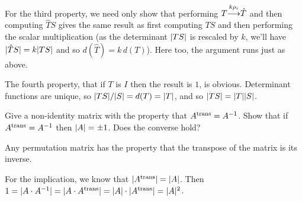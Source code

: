 \begin{exercises}
\begin{answer}
\begin{exparts}
          For the third property, we need only show that performing
          $T\smash[b]{\mathrel{ \mathop{\longrightarrow}\limits^{k\rho_i\mathstrut}_{ \begin{subarray}{l} \relax \end{subarray}}}}\hat{T}$ 
          and then computing \( \hat{T}S \) gives the same result as
          first computing \( TS \) and then performing the scalar 
          multiplication
          (as the determinant \( \deter{TS} \) is rescaled by \( k \), 
          we'll have \( \deter{\hat{T}S}=k\deter{TS} \) and
          so \( d(\hat{T})=k\,d(T) \)).
          Here too, the argument runs just as above.

          The fourth property, that if $T$ is $I$ then the result is $1$, 
          is obvious.
        \partsitem Determinant functions are unique, so
          \( \deter{TS}/\deter{S}=d(T)=\deter{T} \),
          and so $\deter{TS}=\deter{T}\deter{S}$.
      \end{exparts}
    \end{answer}
  \item 
    Give a non-identity matrix with the property that
    \( {{A}^{\rm trans}}=A^{-1} \).
    Show that if \( {{A}^{\rm trans}}=A^{-1} \) then \( \deter{A}=\pm 1 \).
    Does the converse hold?
    \begin{answer}
      Any permutation matrix has the property that the transpose of the
      matrix is its inverse.

      For the implication, we know that \( \deter{\trans{A}}=\deter{A} \).
      Then \( 1=\deter{A\cdot A^{-1}}=\deter{A\cdot\trans{A}}
               =\deter{A}\cdot\deter{\trans{A}}=\deter{A}^2 \).


\end{answer}
\end{exercises}
